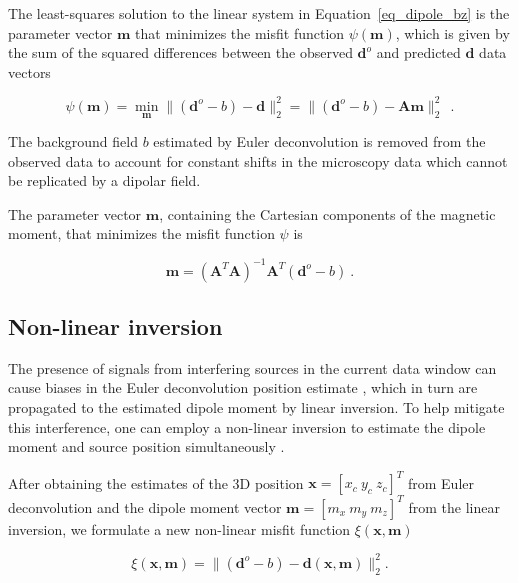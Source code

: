 \documentclass[onecolumn,12pt,a4paper]{article}
\begin{document}
    The least-squares solution to the linear system in  Equation~\ref{eq_dipole_bz} is the parameter vector $\mathbf{m}$ that minimizes the misfit function $\psi(\mathbf{m})$, which is given by the sum of the squared differences between the observed  $\mathbf{d}^o$ and predicted $\mathbf{d}$ data vectors

    \begin{equation}
    \label{psi_function}
    \psi(\mathbf{m}) 
    = \min_{\mathbf{m}} \| (\mathbf{d}^o - b) - \mathbf{d} \|_2^2
    = \| (\mathbf{d}^o - b) - \mathbf{A}\mathbf{m} \|_2^2\ 
    \ .
    \end{equation}

    \noindent
    The background field $b$ estimated by Euler deconvolution is removed from the observed data to account for constant shifts in the microscopy data which cannot be replicated by a dipolar field.

    The parameter vector $\mathbf{m}$, containing the Cartesian components of the magnetic moment, that minimizes the misfit function $\psi$ is

    \begin{equation}
    \label{dipole_moment_solution}
    \mathbf{m} = \left(\mathbf{A}^T \mathbf{A}\right)^{-1} \mathbf{A}^T (\mathbf{d}^o - b)\ .
    \end{equation}

        
\subsection{Non-linear inversion} 

    The presence of signals from interfering sources in the current data window can cause biases in the Euler deconvolution position estimate \citep{Uieda2025}, which in turn are propagated to the estimated dipole moment by linear inversion. 
    To help mitigate this interference, one can employ a non-linear inversion to estimate the dipole moment and source position simultaneously \citep[\textit{e.g.}][]{Lima2016}. 

     After obtaining the estimates of the 3D position $\mathbf{x} = [x_{c}\ y_{c}\ z_{c}]^T$ from Euler deconvolution and the dipole moment vector $\mathbf{m} = [m_{x}\ m_{y}\ m_{z}]^T$ from the linear inversion, we formulate a new non-linear misfit function $\xi(\mathbf{x}, \mathbf{m})$ 

    \begin{equation}
    \label{misfit_equation}
    \xi(\mathbf{x}, \mathbf{m}) = 
    \| (\mathbf{d}^o - b) - \mathbf{d}(\mathbf{x}, \mathbf{m}) \|_2^2.
    \end{equation} 
\end{document}
